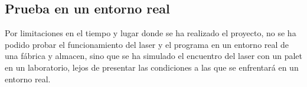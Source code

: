 \subsection{Prueba en un entorno real}
Por limitaciones en el tiempo y lugar donde se ha realizado el proyecto, no se ha podido probar el funcionamiento del laser y el programa en un entorno real de una fábrica y almacen, sino que se ha simulado el encuentro del laser con un palet en un laboratorio, lejos de presentar las condiciones a las que se enfrentará en un entorno real.






